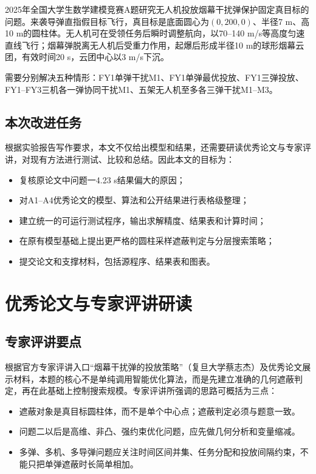 \documentclass[12pt,a4paper]{article}
\begin{document}
2025年全国大学生数学建模竞赛A题研究无人机投放烟幕干扰弹保护固定真目标的问题。来袭导弹直指假目标飞行，真目标是底面圆心为$(0,200,0)$、半径7 m、高10 m的圆柱体。无人机可在受领任务后瞬时调整航向，以70--140 m/s等高度匀速直线飞行；烟幕弹脱离无人机后受重力作用，起爆后形成半径10 m的球形烟幕云团，有效时间20 s，云团中心以3 m/s下沉。

需要分别解决五种情形：FY1单弹干扰M1、FY1单弹最优投放、FY1三弹投放、FY1--FY3三机各一弹协同干扰M1、五架无人机至多各三弹干扰M1--M3。

\subsection{本次改进任务}

根据实验报告写作要求，本文不仅给出模型和结果，还需要研读优秀论文与专家评讲，对现有方法进行测试、比较和总结。因此本文的目标为：
\begin{itemize}
\item 复核原论文中问题一4.23 s结果偏大的原因；
\item 对A1--A4优秀论文的模型、算法和公开结果进行表格级整理；
\item 建立统一的可运行测试程序，输出求解精度、结果表和计算时间；
\item 在原有模型基础上提出更严格的圆柱采样遮蔽判定与分层搜索策略；
\item 提交论文和支撑材料，包括源程序、结果表和图表。
\end{itemize}

\section{优秀论文与专家评讲研读}

\subsection{专家评讲要点}

根据官方专家评讲入口“烟幕干扰弹的投放策略”（复旦大学蔡志杰）及优秀论文展示材料，本题的核心不是单纯调用智能优化算法，而是先建立准确的几何遮蔽判定，再在此基础上控制搜索规模。专家评讲所强调的思路可概括为三点：
\begin{itemize}
\item 遮蔽对象是真目标圆柱体，而不是单个中心点；遮蔽判定必须与题意一致。
\item 问题二以后是高维、非凸、强约束优化问题，应先做几何分析和变量缩减。
\item 多弹、多机、多导弹问题应关注时间区间并集、任务分配和投放间隔约束，不能只把单弹遮蔽时长简单相加。
\end{itemize}
\end{document}
